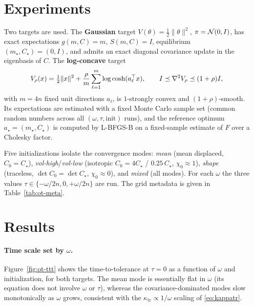\documentclass[11pt]{article}
\begin{document}
\section{Experiments}

Two targets are used. The \textbf{Gaussian} target $V(\theta)=\tfrac12\|\theta\|^2$,
$\pi=\mathcal{N}(0,I)$, has exact expectations $g(m,C)=m$, $S(m,C)=I$, equilibrium
$(m_\star,C_\star)=(0,I)$, and admits an exact diagonal covariance update in the
eigenbasis of $C$. The \textbf{log-concave} target
\begin{equation}
V_\rho(x)=\tfrac12\|x\|^2+\frac{\rho}{m}\sum_{\ell=1}^{m}\log\cosh(a_\ell^\top x),
\qquad
I\preceq\nabla^2 V_\rho\preceq(1+\rho)I,
\end{equation}
with $m=4n$ fixed unit directions $a_\ell$, is $1$-strongly convex and
$(1+\rho)$-smooth. Its expectations are estimated with a fixed Monte Carlo sample
set (common random numbers across all $(\omega,\tau,\text{init})$ runs), and the
reference optimum $a_\star=(m_\star,C_\star)$ is computed by L-BFGS-B on a
fixed-sample estimate of $F$ over a Cholesky factor.

Five initializations isolate the convergence modes: \emph{mean} (mean
displaced, $C_0=C_\star$), \emph{vol-high}/\emph{vol-low} (isotropic
$C_0=4C_\star$ / $0.25\,C_\star$, $\chi_0\approx1$), \emph{shape} (traceless,
$\det C_0=\det C_\star$, $\chi_0\approx0$), and \emph{mixed} (all modes). For
each $\omega$ the three values $\tau\in\{-\omega/2n,0,+\omega/2n\}$ are run. The
grid metadata is given in Table~\ref{tab:ot-meta}.

\begin{table}[t]
\centering
\caption{Configuration of the two $(\omega,\tau)$ grids. The Gaussian target uses
exact expectations; the log-concave target uses a fixed Monte Carlo sample set
with a numerically computed reference optimum $F_\star$.}
\label{tab:ot-meta}
\end{table}

\section{Results}

\paragraph{Time scale set by $\omega$.}
Figure~\ref{fig:ot-ttt} shows the time-to-tolerance at $\tau=0$ as a function of
$\omega$ and initialization, for both targets. The mean mode is essentially flat
in $\omega$ (its equation does not involve $\omega$ or $\tau$), whereas the
covariance-dominated modes slow monotonically as $\omega$ grows, consistent with
the $\kappa_{\mathrm{tr}}\propto1/\omega$ scaling of \eqref{eq:kappatr}.
\end{document}
